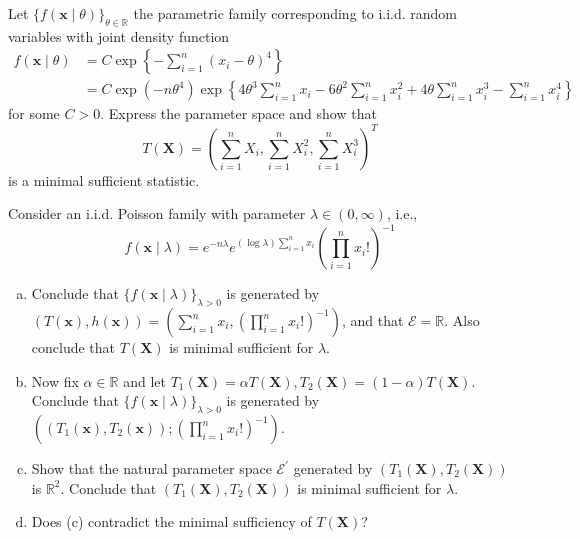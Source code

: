\begin{exercise}
    Let \(\{f(\mathbf{x} \mid \theta)\}_{\theta \in \mathbb{R}}\) the parametric family corresponding to i.i.d. random variables with joint density function
    \[
        \begin{aligned}
            f(\mathbf{x} \mid \theta)&=C \exp \left\{-\sum_{i=1}^{n}\left(x_{i}-\theta\right)^{4}\right\}\\
            &=C \exp \left(-n \theta^{4}\right) \exp \left\{4 \theta^{3} \sum_{i=1}^{n} x_{i}-6 \theta^{2} \sum_{i=1}^{n} x_{i}^{2}+4 \theta \sum_{i=1}^{n} x_{i}^{3}-\sum_{i=1}^{n} x_{i}^{4}\right\}
        \end{aligned}
    \]
    for some \(C>0\). Express the parameter space and show that
    \[
        T(\mathbf{X})=\left(\sum_{i=1}^{n} X_{i}, \sum_{i=1}^{n} X_{i}^{2}, \sum_{i=1}^{n} X_{i}^{3}\right)^T
    \]
    is a minimal sufficient statistic. 
\end{exercise}

\begin{exercise}
    Consider an i.i.d. Poisson family with parameter \(\lambda \in(0, \infty)\), i.e.,
    \[
        f(\mathbf{x} \mid \lambda)=e^{-n \lambda} e^{(\log \lambda) \sum_{i=1}^{n} x_{i}}\left(\prod_{i=1}^{n} x_{i} !\right)^{-1}
    \]
    \begin{enumerate}[(a)]
        \item Conclude that \(\{f(\mathbf{x} \mid \lambda)\}_{\lambda>0}\) is generated by \((T(\mathbf{x}), h(\mathbf{x}))=\left(\sum_{i=1}^{n} x_{i},\left(\prod_{i=1}^{n} x_{i} !\right)^{-1}\right)\), and that \(\mathcal{E}=\mathbb{R}\). Also conclude that \(T(\mathbf{X})\) is minimal sufficient for \(\lambda\). 
        \item Now fix \(\alpha \in \mathbb{R}\) and let \(T_{1}(\mathbf{X})=\alpha T(\mathbf{X}), T_{2}(\mathbf{X})=(1-\alpha) T(\mathbf{X})\). Conclude that \(\{f(\mathbf{x} \mid \lambda)\}_{\lambda>0}\) is generated by \(\left(\left(T_{1}(\mathbf{x}), T_{2}(\mathbf{x})\right) ;\left(\prod_{i=1}^{n} x_{i} !\right)^{-1}\right)\). 
        \item Show that the natural parameter space \(\mathcal{E}^{\prime}\) generated by \(\left(T_{1}(\mathbf{X}), T_{2}(\mathbf{X})\right)\) is \(\mathbb{R}^{2}\). Conclude that \(\left(T_{1}(\mathbf{X}), T_{2}(\mathbf{X})\right)\) is minimal sufficient for \(\lambda\). 
        \item Does (c) contradict the minimal sufficiency of \(T(\mathbf{X})\)? 
    \end{enumerate}
\end{exercise}


